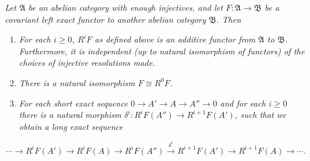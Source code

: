 { \emph{Let $\mathfrak A$ be an abelian category with enough injectives, and let $F\colon\mathfrak A\to\mathfrak B$ be a covariant left exact functor to another abelian category $\mathfrak B$. Then}
\begin{enumerate}[label=(\alph*),leftmargin=2.2em,itemsep=0pt,topsep=2pt,parsep=0pt]
\item \emph{For each $i\geqslant0$, $R^iF$ as defined above is an additive functor from $\mathfrak A$ to $\mathfrak B$. Furthermore, it is independent (up to natural isomorphism of functors) of the choices of injective resolutions made.}
\item \emph{There is a natural isomorphism $F\cong R^0F$.}
\item\hypertarget{result-III-1.1Ac}{} \emph{For each short exact sequence $0\to A'\to A\to A''\to0$ and for each $i\geqslant0$ there is a natural morphism $\delta^i\colon R^iF(A'')\to R^{i+1}F(A')$, such that we obtain a long exact sequence}
\end{enumerate}
\[
  \cdots\to R^iF(A')\to R^iF(A)\to R^iF(A'')
    \xrightarrow{\delta^i} R^{i+1}F(A')\to R^{i+1}F(A)\to\cdots.
\]
}
